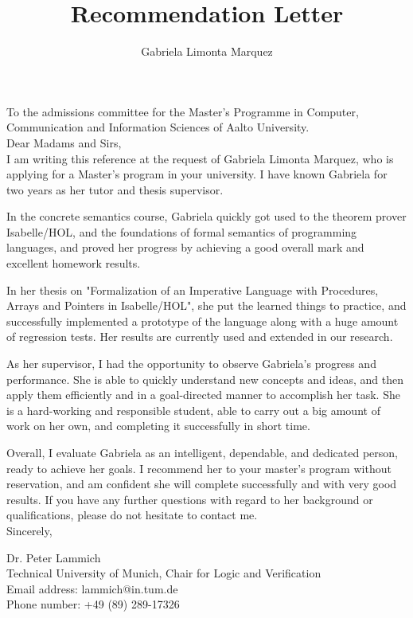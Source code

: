 \documentclass[10pt]{article}
\title{Recommendation Letter}
\author{Gabriela Limonta Marquez}
\newcommand{\program}{Master's Programme in Computer, Communication and Information Sciences of Aalto University}
\begin{document}
\maketitle
\thispagestyle{empty}
\noindent
To the admissions committee for the \program.\\[3em]
%
%
Dear Madams and Sirs,\\[1em]
I am writing this reference at the request of Gabriela Limonta Marquez, who is applying for a Master's program in your university. 
I have known Gabriela for two years as her tutor and thesis supervisor.

In the concrete semantics course, Gabriela quickly got used to the theorem prover Isabelle/HOL, and the foundations of formal 
semantics of programming languages, and proved her progress by achieving a good overall mark and excellent homework results.

In her thesis on "Formalization of an Imperative Language with Procedures, Arrays and Pointers in Isabelle/HOL", 
she put the learned things to practice, and successfully implemented a prototype of the language along with a huge amount of regression tests.
Her results are currently used and extended in our research.

As her supervisor, I had the opportunity to observe Gabriela's progress and performance.
She is able to quickly understand new concepts and ideas, and then apply them efficiently 
and in a goal-directed manner to accomplish her task. She is a hard-working and responsible student, able to 
carry out a big amount of work on her own, and completing it successfully in short time.

Overall, I evaluate Gabriela as an intelligent, dependable, and dedicated person, ready to achieve her goals.
I recommend her to your master's program without reservation, and am confident she will complete successfully and with very good results.
If you have any further questions with regard to her background or qualifications, please do not hesitate to contact me.\\[1em]
%
Sincerely,

  Dr. Peter Lammich\\[.7em]
%
Technical University of Munich, Chair for Logic and Verification\\
Email address: lammich@in.tum.de\\
Phone number: +49 (89) 289-17326 
\end{document}
